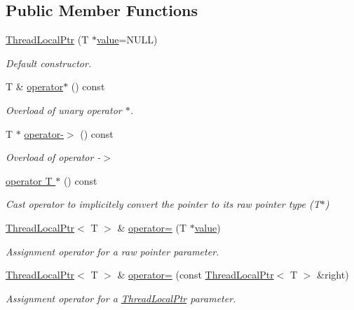 \subsection*{Public Member Functions}
\begin{DoxyCompactItemize}
\item 
\hyperlink{classsf_1_1_thread_local_ptr_a8c678211d7828d2a8c41cb534422d649}{Thread\-Local\-Ptr} (T $\ast$\hyperlink{gl3_8h_a8ad81492d410ff2ac11f754f4042150f}{value}=N\-U\-L\-L)
\begin{DoxyCompactList}\small\item\em Default constructor. \end{DoxyCompactList}\item 
T \& \hyperlink{classsf_1_1_thread_local_ptr_aa3bac9a08e8739613961659d10e0fadd}{operator$\ast$} () const 
\begin{DoxyCompactList}\small\item\em Overload of unary operator $\ast$. \end{DoxyCompactList}\item 
T $\ast$ \hyperlink{classsf_1_1_thread_local_ptr_aa0b559f78929b22cb2585cb2966edfb2}{operator-\/$>$} () const 
\begin{DoxyCompactList}\small\item\em Overload of operator -\/$>$ \end{DoxyCompactList}\item 
\hyperlink{classsf_1_1_thread_local_ptr_ab4a6a341c26b58f0ed3ef86502bd9572}{operator T $\ast$} () const 
\begin{DoxyCompactList}\small\item\em Cast operator to implicitely convert the pointer to its raw pointer type (T$\ast$) \end{DoxyCompactList}\item 
\hyperlink{classsf_1_1_thread_local_ptr}{Thread\-Local\-Ptr}$<$ T $>$ \& \hyperlink{classsf_1_1_thread_local_ptr_a14dcf1cdf5f6b3bcdd633014b2b671f5}{operator=} (T $\ast$\hyperlink{gl3_8h_a8ad81492d410ff2ac11f754f4042150f}{value})
\begin{DoxyCompactList}\small\item\em Assignment operator for a raw pointer parameter. \end{DoxyCompactList}\item 
\hyperlink{classsf_1_1_thread_local_ptr}{Thread\-Local\-Ptr}$<$ T $>$ \& \hyperlink{classsf_1_1_thread_local_ptr_a6792a6a808af06f0d13e3ceecf2fc947}{operator=} (const \hyperlink{classsf_1_1_thread_local_ptr}{Thread\-Local\-Ptr}$<$ T $>$ \&right)
\begin{DoxyCompactList}\small\item\em Assignment operator for a \hyperlink{classsf_1_1_thread_local_ptr}{Thread\-Local\-Ptr} parameter. \end{DoxyCompactList}\end{DoxyCompactItemize}
